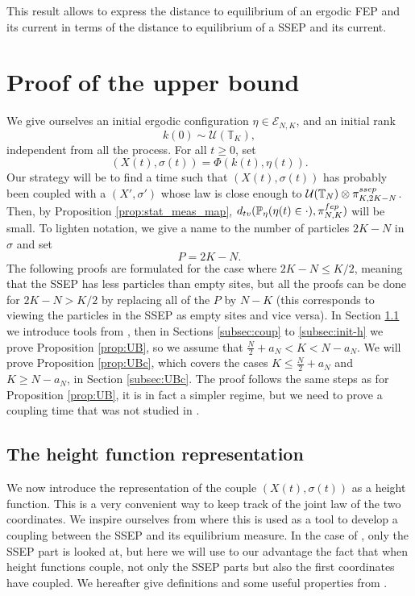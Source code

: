 \documentclass[11pt,a4paper]{article}
\newcommand{\T}{\mathbb{T}}
\newcommand{\PP}{\mathbb{P}}
\newcommand{\FEP}{\textsc{fep}}
\newcommand{\SSEP}{\textsc{ssep}}
\newcommand{\eqs}[1]{\begin{equation}#1\end{equation}}
\newcommand{\eq}[2]{\begin{equation}\label{#1}#2\end{equation}}
\begin{document}
This result allows to express the distance to equilibrium of an ergodic FEP and its current in terms of the distance to equilibrium of a SSEP and its current.
\section{Proof of the upper bound}\label{sec:u}
We give ourselves an initial ergodic configuration $\eta\in \mathcal{E}_{N,K}$, and an initial rank 
\eqs{k(0) \sim \mathcal{U}(\T_K),} 
independent from all the process. For all $t\ge 0$, set 
\eq{eq:defXsigma}{(X(t),\sigma(t)) = \Phi(k(t),\eta(t)).}
Our strategy will be to find a time such that $(X(t), \sigma(t))$ has probably been coupled with a $(X',\sigma')$ whose law is close enough to $\mathcal{U}(\T_{N}) \otimes \pi^{\SSEP}_{K,2K-N}$. Then, by Proposition \ref{prop:stat_meas_map}, $d_{\textsc{tv}}(\PP_\eta(\eta(t) \in \cdot), \pi^{\FEP}_{N,K})$ will be small. 
To lighten notation, we give a name to the number of particles $2K-N$ in $\sigma$ and set
 \eqs{P = 2K-N.}
The following proofs are formulated for the case where $2K-N \le K/2$, meaning that the SSEP has less particles than empty sites, but all the proofs can be done for $2K-N > K/2$ by replacing all of the $P$ by $N-K$ (this corresponds to viewing the particles in the SSEP as empty sites and vice versa). 
In Section \ref{subsec:hf} we introduce tools from \cite{lacoin_simple_2017}, then in Sections \ref{subsec:coup} to \ref{subsec:init-h} we prove Proposition \ref{prop:UB}, so we assume that $\frac{N}{2} + a_N < K < N-a_N $. We will prove Proposition \ref{prop:UBc}, which covers the cases $K \le \frac{N}{2} + a_N$ and $K \ge N-a_N$, in Section \ref{subsec:UBc}. The proof follows the same steps as for Proposition \ref{prop:UB}, it is in fact a simpler regime, but we need to prove a coupling time that was not studied in \cite{lacoin_simple_2017}.

 \subsection{The height function representation}
 \label{subsec:hf}
 We now introduce the representation of the couple $(X(t), \sigma(t))$ as a height function. This is a very convenient way to keep track of the joint law of the two coordinates. We inspire ourselves from \cite{lacoin_simple_2017} where this is used as a tool to develop a coupling between the SSEP and its equilibrium measure. In the case of \cite{lacoin_simple_2017}, only the SSEP part is looked at, but here we will use to our advantage the fact that when height functions couple, not only the SSEP parts but also the first coordinates have coupled. We hereafter give definitions and some useful properties from \cite{lacoin_simple_2017}.
 
\end{document}
